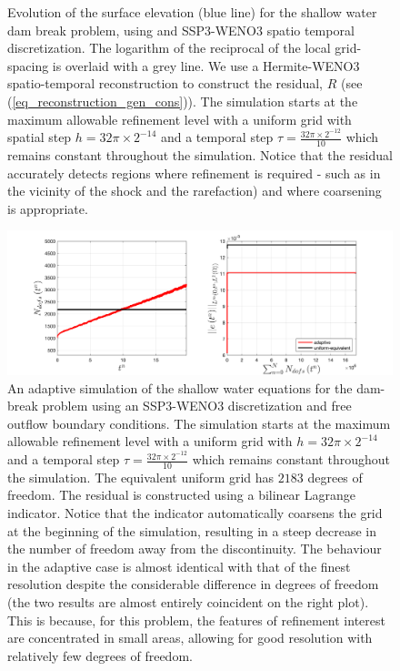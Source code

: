 \documentclass[final]{amsart}
\numberwithin{equation}{section}
\begin{document}
\begin{figure}[H]
\begin{subfigure}[b]{.25\textwidth}
	\caption{
		\label{fig_shw_dambreakSHW_dambreak_RK3_WENO3_rec_3_fixed_gs_stills_7001_adaptONOFF}
	}
\end{subfigure}
	\caption{\label{fig:SSP3WENO_shw_stills} Evolution of the surface elevation (blue line) for the shallow water dam break problem, using and SSP3-WENO3 spatio temporal discretization.  The logarithm of the reciprocal of the local grid-spacing is overlaid with a grey line. We use a Hermite-WENO3 spatio-temporal reconstruction to construct the residual, $R$ (see (\ref{eq_reconstruction_gen_cons})). The simulation starts at the maximum allowable refinement level with a uniform grid with spatial step $h=32\pi \times 2^{-14}$ and a temporal step $\tau =\frac{32\pi\times2^{-12}}{10}$ which remains constant throughout the simulation.  Notice that the residual accurately detects regions where refinement is required - such as in the vicinity of the shock and the rarefaction) and where coarsening is appropriate.}
\end{figure}


\begin{figure}[H]
\centering
\includegraphics[width=\textwidth]{../figures/fig_SHW_dambreak_RK3_WENO3_rec_3_fixed_gsplots_1x5_shw_dambreak_comparison_adaptONOFF}	
	\caption{\label{fig:SSP3WENO3_shw_dambreak_adapt} An adaptive simulation of the shallow water equations for the dam-break problem using an SSP3-WENO3 discretization and free outflow boundary conditions.  The simulation starts at the maximum allowable refinement level with a uniform grid with $h=32\pi \times 2^{-14}$ and a temporal step $\tau =\frac{32\pi\times2^{-12}}{10}$ which remains constant throughout the simulation. The equivalent uniform grid has $2183$ degrees of freedom.  The residual is constructed using a bilinear Lagrange indicator.  Notice that the indicator automatically coarsens the grid at the beginning of the simulation, resulting in a steep decrease in the number of freedom away from the discontinuity. The behaviour in the adaptive case is almost identical with that of the finest resolution despite the considerable difference in degrees of freedom (the two results are almost entirely coincident on the right plot).  This is because, for this problem, the features of refinement interest are concentrated in small areas, allowing for good resolution with relatively few degrees of freedom. }
\end{figure}
\end{document}
